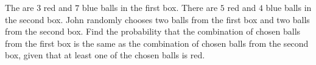 The are $3$ red and $7$ blue balls in the first box. There are $5$ red and $4$ blue balls in the second box. John randomly chooses two balls from the first box and two balls from the second box. Find the probability that the combination of chosen balls from the first box is the same as the combination of chosen balls from the second box, given that at least one of the chosen balls is red. 
